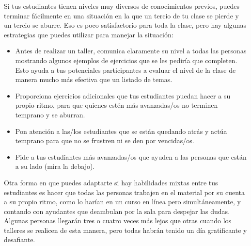 
Si tus estudiantes tienen niveles muy diversos de conocimientos previos,
puedes terminar fácilmente en una situación en la que un tercio de tu clase se pierde
y un tercio se aburre.
Eso es poco satisfactorio para toda la clase,
pero hay algunas estrategias que puedes utilizar para manejar la situación:

\begin{itemize}

\item
  Antes de realizar un taller,
  comunica claramente su nivel a todas las personas mostrando algunos ejemplos de ejercicios que se les pediría que completen.
  Esto ayuda a tus potenciales participantes a evaluar el nivel de la clase
  de manera mucho más efectiva que un listado de temas.
  
\item
  Proporciona ejercicios adicionales que tus estudiantes puedan hacer a su propio ritmo,
  para que quienes estén más avanzadas/os no terminen temprano y se aburran.

\item
  Pon atención a las/los estudiantes que se están quedando atrás
  y actúa temprano para que no se frustren ni se den por vencidas/os.

\item
  Pide a tus estudiantes más avanzadas/os que ayuden a las personas que están a su lado
  (mira la  debajo).

\end{itemize}

Otra forma en que puedes adaptarte si hay habilidades mixtas entre tus estudiantes es
hacer que todas las personas trabajen en el material por su cuenta a su propio ritmo,
como lo harían en un curso en línea pero simultáneamente,
y contando con ayudantes que deambulan por la sala para despejar las dudas.
Algunas personas llegarán tres o cuatro veces más lejos que otras cuando los talleres se realicen de esta manera,
pero todas habrán tenido un día gratificante y desafiante.

